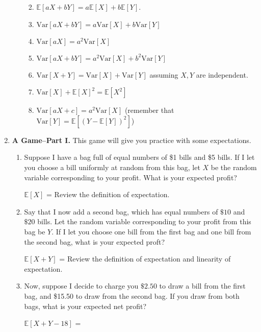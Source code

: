 \documentclass[11pt,preview]{standalone} %
\newcommand{\E}{\mathbb{E}}
\newcommand{\Var}{\text{Var}}
\begin{document}
\begin{enumerate}
\begin{enumerate}
\begin{Multi}
\begin{enumerate}
\TrueChoice\item $\E[aX + bY] = a\E[X]+ b\E[Y]$. 
\FalseChoice\item $\Var[aX + bY] = a\Var[X] + b\Var[Y]$
\TrueChoice\item $\Var[aX] = a^2\Var[X]$
\FalseChoice\item $\Var[aX + bY] = a^2\Var[X] + b^2\Var[Y]$
\TrueChoice\item $\Var[X + Y] = \Var[X] + \Var[Y]$ assuming $X,Y$ are independent.
\TrueChoice\item $\Var[X] + \E[X]^2 = \E[X^2]$
\TrueChoice\item $\Var[aX + c] = a^2\Var[X]$  (remember that $\Var[Y] = \E[(Y - \E[Y])^2]$)
\end{enumerate}
\end{Multi}
\end{enumerate}
\item {\bf A Game--Part I.} This game will give you practice with some expectations. 
\begin{enumerate}
\item Suppose I have a bag full of equal numbers of \$1 bills and \$5 bills. If I let you choose a bill uniformly at random from this bag, let $X$ be the random variable corresponding to your profit. What is your expected profit?
\begin{Freeform}{3}
$\E[X]$ = 
\Hint Review the definition of expectation.
\end{Freeform}
\item Say that I now add a second bag, which has equal numbers of $\$10$ and $\$20$ bills. Let the random variable corresponding to your profit from this bag be $Y$. If I let you choose one bill from the first bag and one bill from the second bag, what is your expected proft?
\begin{Freeform}{18}
$\E[X + Y]$ = 
\Hint Review the definition of expectation and linearity of expectation.
\end{Freeform}
\item Now, suppose I decide to charge you $\$2.50$ to draw a bill from the first bag, and \$15.50 to draw from the second bag. If you draw from both bags, what is your expected net profit?
\begin{Freeform}{0}
$\E[X + Y - 18]$ = 

\end{Freeform}
\end{enumerate}
\end{enumerate}
\end{document}
